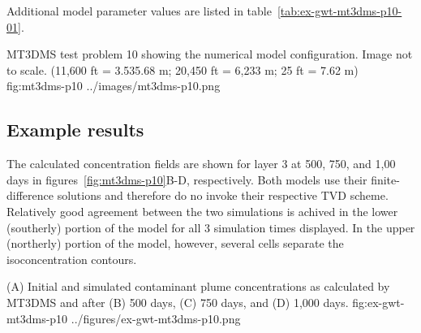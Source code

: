 Additional model parameter values are listed in table~\ref{tab:ex-gwt-mt3dms-p10-01}.  

\begin{StandardFigure}
	{MT3DMS test problem 10 showing the numerical model configuration.  Image not to scale. (11,600 ft = 3.535.68 m; 20,450 ft = 6,233 m; 25 ft = 7.62 m)} 
	{fig:mt3dms-p10}
	{../images/mt3dms-p10.png}
\end{StandardFigure}



\subsection{Example results}

The calculated concentration fields are shown for layer 3 at 500, 750, and 1,00 days in figures~\ref{fig:mt3dms-p10}B-D, respectively.  Both models use their finite-difference solutions and therefore do no invoke their respective TVD scheme.  Relatively good agreement between the two simulations is achived in the lower (southerly) portion of the model for all 3 simulation times displayed.  In the upper (northerly) portion of the model, however, several cells separate the isoconcentration contours.

\begin{StandardFigure}
	{(A) Initial and simulated contaminant plume concentrations as calculated by MT3DMS and \mf after (B) 500 days, (C) 750 days, and (D) 1,000 days.} 
	{fig:ex-gwt-mt3dms-p10}
	{../figures/ex-gwt-mt3dms-p10.png}
\end{StandardFigure}
